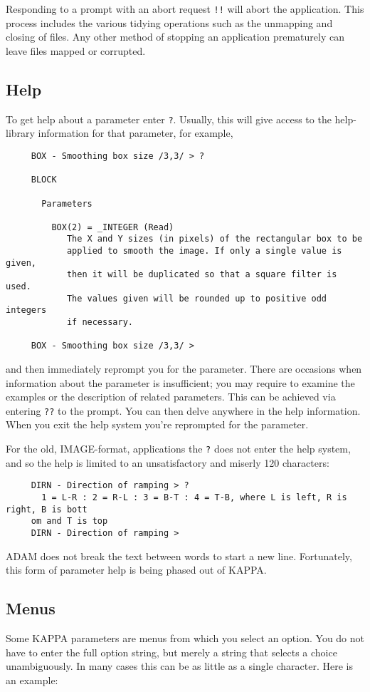 Responding to a prompt with an abort request {\tt !!} will abort the
application.  This process includes the various tidying operations
such as the unmapping and closing of files.  Any other method of
stopping an application prematurely can leave files mapped or corrupted.

\subsection{Help}
\label{se:parhelp}
To get help about a parameter enter {\tt ?}.  Usually, this will give
access to the help-library
information for that parameter, for example,

\small
\begin{verbatim}
     BOX - Smoothing box size /3,3/ > ?

     BLOCK

       Parameters

         BOX(2) = _INTEGER (Read)
            The X and Y sizes (in pixels) of the rectangular box to be
            applied to smooth the image. If only a single value is given,
            then it will be duplicated so that a square filter is used.
            The values given will be rounded up to positive odd integers
            if necessary.

     BOX - Smoothing box size /3,3/ >
\end{verbatim}
\normalsize
and then immediately reprompt you for the parameter.  There are
occasions when information about the parameter is insufficient; you
may require to examine the examples or the description of related
parameters.  This can be achieved via entering {\tt ??} to the prompt.
You can then delve anywhere in the help information.  When you exit the help
system you're reprompted for the parameter.

For the old, IMAGE-format, applications the {\tt ?} does not enter
the help system, and so the help is limited to an unsatisfactory and
miserly 120 characters:

\small
\begin{verbatim}
     DIRN - Direction of ramping > ?
       1 = L-R : 2 = R-L : 3 = B-T : 4 = T-B, where L is left, R is right, B is bott
     om and T is top
     DIRN - Direction of ramping >
\end{verbatim}
\normalsize
{\small ADAM} does not break the text between words
to start a new line.  Fortunately, this form of parameter help is
being phased out of {\small KAPPA}.

\subsection{Menus}
Some {\small KAPPA} parameters are menus from which you select an option.
You do not have to enter the full option string, but merely a string
that selects a choice unambiguously.  In many cases this can be as
little as a single character.  Here is an example:


